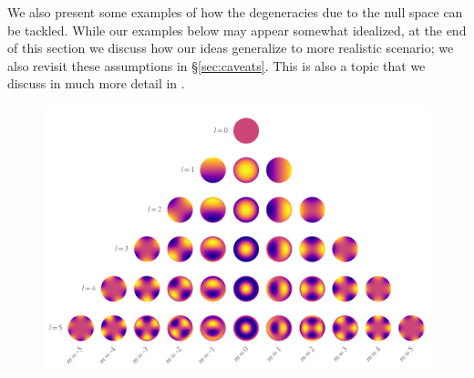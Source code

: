\documentclass[modern,linenumbers]{aastex62}
\begin{document}
We also present some examples of how the degeneracies due to
the null space can be tackled.
While our examples below may appear somewhat idealized, at the end
of this section we discuss how our ideas generalize to more
realistic scenario; we also revisit these assumptions in \S\ref{sec:caveats}.
This is also a topic that we discuss in much more detail in .

\begin{figure}[t!]
    \begin{centering}
        \includegraphics[width=\linewidth]{figures/ylms.pdf}
    \end{centering}
\end{figure}
\end{document}

